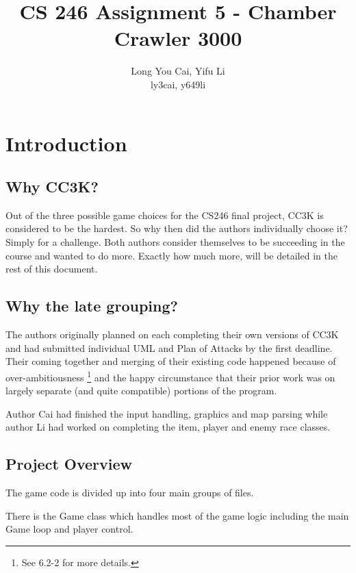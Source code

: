 \documentclass{article}
\begin{document}
\author{Long You Cai, Yifu Li\\ly3cai, y649li}
\title{CS 246 Assignment 5 - Chamber Crawler 3000}
\maketitle

\tableofcontents

\pagebreak

\section{Introduction}

\subsection{Why CC3K?}

Out of the three possible game choices for the CS246 final project, CC3K is considered to be the hardest. So why then did the authors individually choose it? Simply for a challenge. Both authors consider themselves to be succeeding in the course and wanted to do more. Exactly how much more, will be detailed in the rest of this document.

\subsection{Why the late grouping?}

The authors originally planned on each completing their own versions of CC3K and had submitted individual UML and Plan of Attacks by the first deadline. Their coming together and merging of their existing code happened because of over-ambitiousness \footnote{See 6.2-2 for more details.} and the happy circumstance that their prior work was on largely separate (and quite compatible) portions of the program. 

Author Cai had finished the input handling, graphics and map parsing while author Li had worked on completing the item, player and enemy race classes.

\subsection{Project Overview}

The game code is divided up into four main groups of files. 

There is the Game class which handles most of the game logic including the main Game loop and player control.
\end{document}
